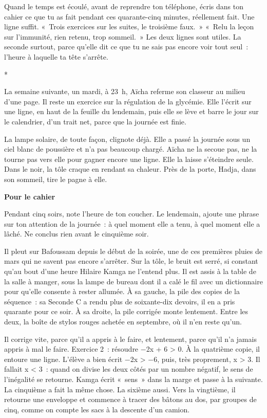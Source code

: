 \documentclass[10.5pt,twoside,openright]{book}
\newcommand{\asterisme}{\par\vspace{0.7em}\centerline{\color{gris}*\quad*\quad*}\vspace{0.7em}\par\noindent}
\newenvironment{pourcahier}[1]{\par\vspace{0.9em}\begin{tcolorbox}[colback=black!4,colframe=accent,boxrule=0pt,leftrule=2.2pt,arc=0pt,left=8pt,right=8pt,top=5pt,bottom=5pt]\small\textbf{#1}\par\smallskip}{\end{tcolorbox}\par}
\newcommand{\chapitre}[2]{\cleardoublepage\markright{#2}\thispagestyle{plain}\vspace*{2.2cm}{\noindent\color{accent}\fontsize{54}{54}\selectfont\bfseries #1}\par\vspace{0.5em}{\noindent\LARGE\bfseries #2\par}\vspace{1.6em}\noindent\ignorespaces}
\begin{document}
Quand le temps est écoulé, avant de reprendre ton téléphone, écris dans ton cahier ce que tu as fait pendant ces quarante-cinq minutes, réellement fait. Une ligne suffit. « Trois exercices sur les suites, le troisième faux. » « Relu la leçon sur l’immunité, rien retenu, trop sommeil. » Les deux lignes sont utiles. La seconde surtout, parce qu’elle dit ce que tu ne sais pas encore voir tout seul : l’heure à laquelle ta tête s’arrête.

\asterisme

La semaine suivante, un mardi, à 23 h, Aïcha referme son classeur au milieu d’une page. Il reste un exercice sur la régulation de la glycémie. Elle l’écrit sur une ligne, en haut de la feuille du lendemain, puis elle se lève et barre le jour sur le calendrier, d’un trait net, parce que la journée est finie.

La lampe solaire, de toute façon, clignote déjà. Elle a passé la journée sous un ciel blanc de poussière et n’a pas beaucoup chargé. Aïcha ne la secoue pas, ne la tourne pas vers elle pour gagner encore une ligne. Elle la laisse s’éteindre seule. Dans le noir, la tôle craque en rendant sa chaleur. Près de la porte, Hadja, dans son sommeil, tire le pagne à elle.

\begin{pourcahier}{Pour le cahier}
Pendant cinq soirs, note l’heure de ton coucher. Le lendemain, ajoute une phrase sur ton attention de la journée : à quel moment elle a tenu, à quel moment elle a lâché. Ne conclus rien avant le cinquième soir.
\end{pourcahier}


\chapitre{9}{L’encre rouge}

Il pleut sur Bafoussam depuis le début de la soirée, une de ces premières pluies de mars qui ne savent pas encore s’arrêter. Sur la tôle, le bruit est serré, si constant qu’au bout d’une heure Hilaire Kamga ne l’entend plus. Il est assis à la table de la salle à manger, sous la lampe de bureau dont il a calé le fil avec un dictionnaire pour qu’elle consente à rester allumée. À sa gauche, la pile des copies de la séquence : sa Seconde C a rendu plus de soixante-dix devoirs, il en a pris quarante pour ce soir. À sa droite, la pile corrigée monte lentement. Entre les deux, la boîte de stylos rouges achetée en septembre, où il n’en reste qu’un.

Il corrige vite, parce qu’il a appris à le faire, et lentement, parce qu’il n’a jamais appris à mal le faire. Exercice 2 : résoudre −2x + 6 > 0. À la quatrième copie, il entoure une ligne. L’élève a bien écrit −2x > −6, puis, très proprement, x > 3. Il fallait x < 3 : quand on divise les deux côtés par un nombre négatif, le sens de l’inégalité se retourne. Kamga écrit « sens » dans la marge et passe à la suivante. La cinquième a fait la même chose. La sixième aussi. Vers la vingtième, il retourne une enveloppe et commence à tracer des bâtons au dos, par groupes de cinq, comme on compte les sacs à la descente d’un camion.
\end{document}
